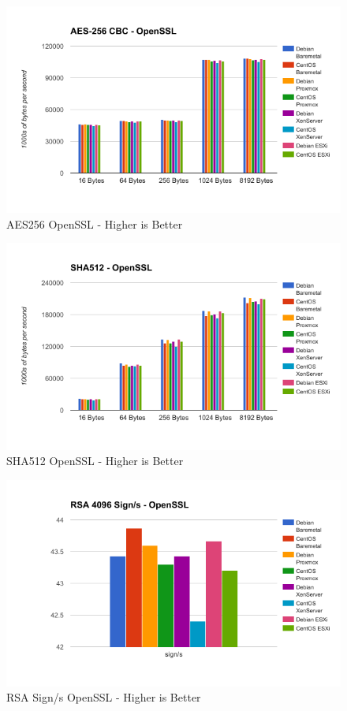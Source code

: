 \documentclass[12pt]{spieman}  %
\begin{document}
\begin{figure}[H]
\caption{AES256 OpenSSL - Higher is Better}
\centering
\includegraphics[width=\textwidth,keepaspectratio]{Graphs/AES256-OpenSSL}
\end{figure}

\begin{figure}[H]
\caption{SHA512 OpenSSL - Higher is Better}
\centering
\includegraphics[width=\textwidth,keepaspectratio]{Graphs/SHA512-OpenSSL}
\end{figure}

\begin{figure}[H]
\caption{RSA Sign/s OpenSSL - Higher is Better}
\centering
\includegraphics[width=\textwidth,keepaspectratio]{Graphs/RSA-Sign-OpenSSL}
\end{figure}
\end{document}
